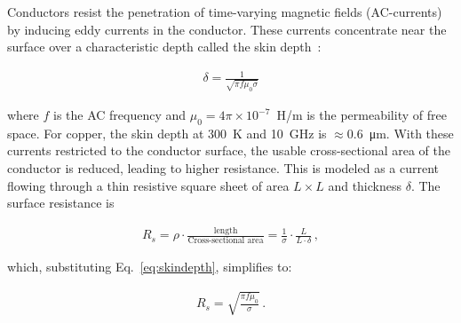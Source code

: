     Conductors resist the penetration of time-varying magnetic fields (AC-currents) by inducing eddy currents in the conductor. These currents concentrate near the surface over a characteristic depth called the skin depth~\cite{johndavidjacksonClassicalElectrodynamicsThird1999}:

    \begin{align}
        \delta = \frac{1}{\sqrt{\pi f \mu_0 \sigma}} \label{eq:skindepth}
    \end{align}
    
    \noindent where $f$ is the AC frequency and $\mu_0=4 \pi\times10^{-7}$~H/m is the permeability of free space. For copper, the skin depth at 300~K and 10~GHz is $\approx 0.6$~\unit{\um}. With these currents restricted to the conductor surface, the usable cross-sectional area of the conductor is reduced, leading to higher resistance. This is modeled as a current flowing through a thin resistive square sheet of area $L\times L$ and thickness $\delta$. The surface resistance is

    

    \begin{align}
        R_s = \rho \cdot \frac{\text{length}}{\text{Cross-sectional area}} = \frac{1}{\sigma} \cdot \frac{L}{L \cdot \delta}\,,
       \label{eq:SurfaceResistance1}
    \end{align}

    \noindent which, substituting Eq.~\ref{eq:skindepth}, simplifies to:

    \begin{align}
        R_s = \sqrt{\frac{\pi f \mu_0}{\sigma}} \,.
       \label{eq:SurfaceResistance2}
    \end{align}

